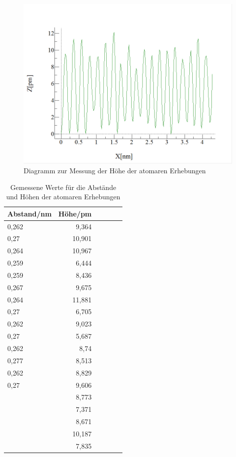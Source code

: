\documentclass[10pt,a4paper]{article}
\begin{document}
\begin{figure}[h]
	\centering
	
	\includegraphics[scale = 0.7]{hohenmessung1_diagramm.png}
	
	\caption{Diagramm zur Messung der Höhe der atomaren Erhebungen}
	\label{Messungerh4}
\end{figure}

\begin{table}[h!]
	\centering
	\begin{tabular}{|l|r|c|lrp{16cm}}\hline
		Abstand/nm & Höhe/pm\\\hline
		0,262 & 9,364 \\
		0,27 & 10,901 \\
		0,264 & 10,967\\
		0,259& 6,444 \\
		0,259 & 8,436 \\
		0,267 & 9,675 \\
		0,264 & 11,881\\
		0,27 & 6,705\\
		0,262 & 9,023\\
		0,27 & 5,687\\
		0,262 & 8,74\\
		0,277 & 8,513\\
		0,262 & 8,829\\
		0,27 & 9,606\\
		& 8,773\\
		& 7,371\\
		& 8,671\\
		& 10,187\\
		& 7,835\\
		\hline
	\end{tabular}
	\caption{Gemessene Werte für die Abstände und Höhen der atomaren Erhebungen}
	\label{Messungerh5}
\end{table}
\end{document}
